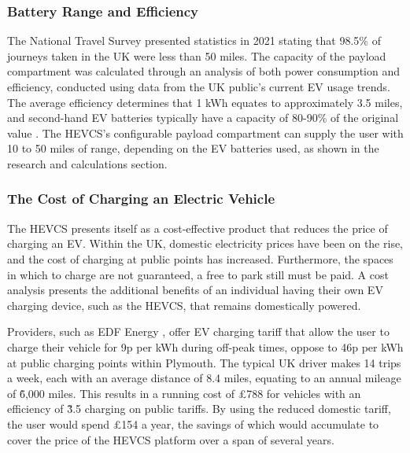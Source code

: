 \documentclass [12pt]{article}
\begin{document}
\subsubsection{Battery Range and Efficiency}

The National Travel Survey presented statistics in 2021 stating that 98.5\% of journeys taken in the UK were less than 50 miles. The capacity of the payload compartment was calculated through an analysis of both power consumption and efficiency, conducted using data from the UK public’s current EV usage trends. The average efficiency determines that 1 kWh equates to approximately 3.5 miles, and second-hand EV batteries typically have a capacity of 80-90\% of the original value \cite{strickland2014estimation}. The HEVCS’s configurable payload compartment can supply the user with 10 to 50 miles of range, depending on the EV batteries used, as shown in the research and calculations section.

\subsubsection{The Cost of Charging an Electric Vehicle}
The HEVCS presents itself as a cost-effective product that reduces the price of charging an EV. Within the UK, domestic electricity prices have been on the rise, and the cost of charging at public points has increased. Furthermore, the spaces in which to charge are not guaranteed, a free to park still must be paid. A cost analysis presents the additional benefits of an individual having their own EV charging device, such as the HEVCS, that remains domestically powered.

Providers, such as EDF Energy \cite{edf}, offer EV charging tariff that allow the user to charge their vehicle for 9p per kWh during off-peak times, oppose to 46p per kWh at public charging points within Plymouth. The typical UK driver makes 14 trips a week, each with an average distance of 8.4 miles, equating to an annual mileage of \~6,000 miles. This results in a running cost of £788 for vehicles with an efficiency of \~3.5 charging on public tariffs. By using the reduced domestic tariff, the user would spend £154 a year, the savings of which would accumulate to cover the price of the HEVCS platform over a span of several years.
\end{document}

